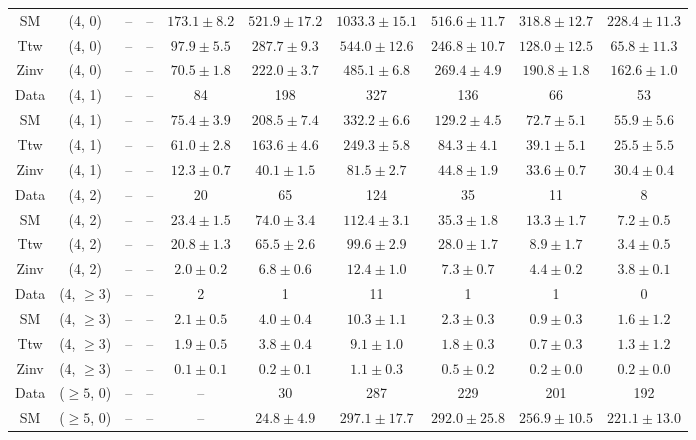 \begin{table}[h!]
{\begin{tabular}{cccccccccc}
	SM & (4, 0) & -- & -- & $173.1\pm 8.2$ & $521.9\pm 17.2$ & $1033.3\pm 15.1$ & $516.6\pm 11.7$ & $318.8\pm 12.7$ & $228.4\pm 11.3$ \\[0.5ex] 
	Ttw & (4, 0) & -- & -- & $97.9\pm 5.5$ & $287.7\pm 9.3$ & $544.0\pm 12.6$ & $246.8\pm 10.7$ & $128.0\pm 12.5$ & $65.8\pm 11.3$ \\[0.5ex] 
	Zinv & (4, 0) & -- & -- & $70.5\pm 1.8$ & $222.0\pm 3.7$ & $485.1\pm 6.8$ & $269.4\pm 4.9$ & $190.8\pm 1.8$ & $162.6\pm 1.0$ \\[0.5ex] 
	Data & (4, 1) & -- & -- & 84 & 198 & 327 & 136 & 66 & 53 \\[0.5ex] 
	SM & (4, 1) & -- & -- & $75.4\pm 3.9$ & $208.5\pm 7.4$ & $332.2\pm 6.6$ & $129.2\pm 4.5$ & $72.7\pm 5.1$ & $55.9\pm 5.6$ \\[0.5ex] 
	Ttw & (4, 1) & -- & -- & $61.0\pm 2.8$ & $163.6\pm 4.6$ & $249.3\pm 5.8$ & $84.3\pm 4.1$ & $39.1\pm 5.1$ & $25.5\pm 5.5$ \\[0.5ex] 
	Zinv & (4, 1) & -- & -- & $12.3\pm 0.7$ & $40.1\pm 1.5$ & $81.5\pm 2.7$ & $44.8\pm 1.9$ & $33.6\pm 0.7$ & $30.4\pm 0.4$ \\[0.5ex] 
	Data & (4, 2) & -- & -- & 20 & 65 & 124 & 35 & 11 & 8 \\[0.5ex] 
	SM & (4, 2) & -- & -- & $23.4\pm 1.5$ & $74.0\pm 3.4$ & $112.4\pm 3.1$ & $35.3\pm 1.8$ & $13.3\pm 1.7$ & $7.2\pm 0.5$ \\[0.5ex] 
	Ttw & (4, 2) & -- & -- & $20.8\pm 1.3$ & $65.5\pm 2.6$ & $99.6\pm 2.9$ & $28.0\pm 1.7$ & $8.9\pm 1.7$ & $3.4\pm 0.5$ \\[0.5ex] 
	Zinv & (4, 2) & -- & -- & $2.0\pm 0.2$ & $6.8\pm 0.6$ & $12.4\pm 1.0$ & $7.3\pm 0.7$ & $4.4\pm 0.2$ & $3.8\pm 0.1$ \\[0.5ex] 
	Data & (4, $\ge3$) & -- & -- & 2 & 1 & 11 & 1 & 1 & 0 \\[0.5ex] 
	SM & (4, $\ge3$) & -- & -- & $2.1\pm 0.5$ & $4.0\pm 0.4$ & $10.3\pm 1.1$ & $2.3\pm 0.3$ & $0.9\pm 0.3$ & $1.6\pm 1.2$ \\[0.5ex] 
	Ttw & (4, $\ge3$) & -- & -- & $1.9\pm 0.5$ & $3.8\pm 0.4$ & $9.1\pm 1.0$ & $1.8\pm 0.3$ & $0.7\pm 0.3$ & $1.3\pm 1.2$ \\[0.5ex] 
	Zinv & (4, $\ge3$) & -- & -- & $0.1\pm 0.1$ & $0.2\pm 0.1$ & $1.1\pm 0.3$ & $0.5\pm 0.2$ & $0.2\pm 0.0$ & $0.2\pm 0.0$ \\[0.5ex] 
	Data & ($\ge5$, 0) & -- & -- & -- & 30 & 287 & 229 & 201 & 192 \\[0.5ex] 
	SM & ($\ge5$, 0) & -- & -- & -- & $24.8\pm 4.9$ & $297.1\pm 17.7$ & $292.0\pm 25.8$ & $256.9\pm 10.5$ & $221.1\pm 13.0$ \\[0.5ex] 

\end{tabular}}
\end{table}
